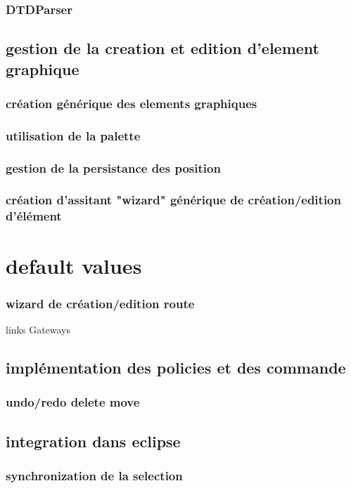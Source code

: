 \documentclass{article}
\begin{document}
        \subsubsection{DTDParser}
    \subsection{gestion de la creation et edition d'element graphique}
        \subsubsection{création générique des elements graphiques}
        \subsubsection{utilisation de la palette}
        \subsubsection{gestion de la persistance des position}

        \subsubsection{création d'assitant "wizard" générique de création/edition d'élément}
            \section{default values}
        \subsubsection{wizard de création/edition route}
            links
            Gateways
    \subsection{implémentation des policies et des commande}
        \subsubsection{undo/redo delete move}
    \subsection{integration dans eclipse}
        \subsubsection{synchronization de la selection}
\end{document}
